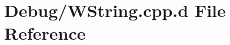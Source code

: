 \hypertarget{_debug_2_w_string_8cpp_8d}{\section{\-Debug/\-W\-String.cpp.\-d \-File \-Reference}
\label{_debug_2_w_string_8cpp_8d}
}
